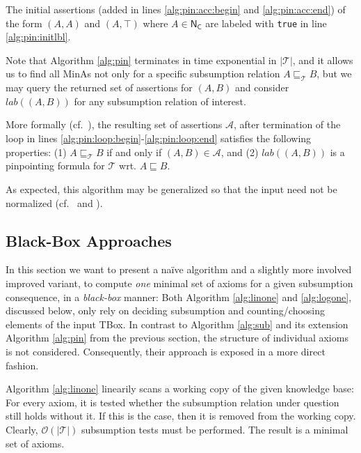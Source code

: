 \documentclass{llncs}
\newcommand{\tb}{\ensuremath{\mathcal{T}}\xspace} %
\newcommand{\nc}{\ensuremath{\mathsf{N_C}}\xspace} %
\newcommand{\subsume}{\sqsubseteq}
\begin{document}
The initial assertions (added in lines \ref{alg:pin:acc:begin} and \ref{alg:pin:acc:end}) of the form $(A, A)$ and $(A, \top)$ where $A \in \nc$ are labeled with \texttt{true} in line \ref{alg:pin:initlbl}.

Note that Algorithm \ref{alg:pin} terminates in time exponential in $|\tb|$, and it allows us to find all MinAs not only for a specific subsumption relation $A \subsume_\tb B$, but we may query the returned set of assertions for $(A, B)$ and consider $lab((A, B))$ for any subsumption relation of interest.

More formally (cf.~\cite[Thm.~2]{orig1,orig2}), the resulting set of assertions $\mathcal{A}$, after termination of the loop in lines \ref{alg:pin:loop:begin}-\ref{alg:pin:loop:end} satisfies the following properties: (1) $A \subsume_\tb B$ if and only if $(A, B) \in \mathcal{A}$, and (2) $lab((A,B))$ is a pinpointing formula for $\tb$ wrt. $A \subsume B$.

As expected, this algorithm may be generalized so that the input need not be normalized (cf.~\cite[Sec.~3]{orig1,orig2} and \cite[Sec.~5.2, p.~107]{meng-phd}).

\subsection{Black-Box Approaches}
\label{sec:black}

In this section we want to present a na\"{i}ve algorithm and a slightly more involved improved variant, to compute \emph{one} minimal set of axioms for a given subsumption consequence, in a \emph{black-box} manner: Both Algorithm \ref{alg:linone} and \ref{alg:logone}, discussed below, only rely on deciding subsumption and counting/choosing elements of the input TBox. In contrast to Algorithm \ref{alg:sub} and its extension Algorithm \ref{alg:pin} from the previous section, the structure of individual axioms is not considered. Consequently, their approach is exposed in a more direct fashion.

Algorithm \ref{alg:linone} linearily scans a working copy of the given knowledge base: For every axiom, it is tested whether the subsumption relation under question still holds without it. If this is the case, then it is removed from the working copy. Clearly, $\mathcal{O}(|\tb|)$ subsumption tests must be performed. The result is a minimal set of axioms.
\end{document}
